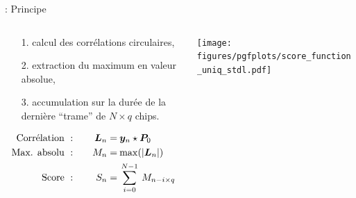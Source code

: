\documentclass[../main.tex]{subfiles}
\begin{document}
\begin{frame}{\subsecname : {Principe}}
  \begin{columns}
    \begin{column}{.4\linewidth}
      \centering
      \begin{itemize}
        \item [1.] calcul des corrélations circulaires,
        \item [2.] extraction du maximum en valeur absolue,
        \item [3.] accumulation sur la durée de la dernière ``trame'' de $N \times q$ chips.
      \end{itemize}
      \begin{align*}
        \text{Corrélation }    & :\quad & \bm{L}_n = & \:\bm{y}_n \star \bm{P}_{0}                 \\
        \text{Max. absolu } & :\quad & M_n =        & \:\mathrm{max}(|\bm{L}_n|)               \\
        \text{Score }          & :\quad & S_n =        & \:\sum_{i = 0}^{N - 1}\:M_{n - i \times q}
      \end{align*}
    \end{column}
    \begin{column}{.6\linewidth}
      \centering
      \texttt{[image: figures/pgfplots/score\_function\_uniq\_stdl.pdf]}
    \end{column}
  \end{columns}
\end{frame}

\end{document}
